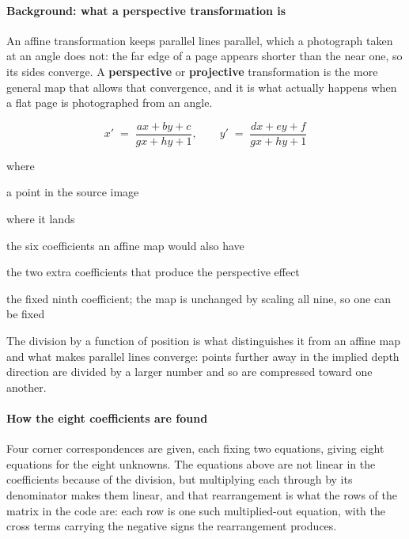\paragraph{Background: what a perspective transformation is}
An affine transformation keeps parallel lines parallel, which a photograph taken at an angle does not: the far edge of a page appears shorter than the near one, so its sides converge. A \textbf{perspective} or \textbf{projective} transformation is the more general map that allows that convergence, and it is what actually happens when a flat page is photographed from an angle.


\begin{equation}
x' \;=\; \frac{a x + b y + c}{g x + h y + 1}, \qquad y' \;=\; \frac{d x + e y + f}{g x + h y + 1}
\end{equation}

\noindent where
\begin{description}[leftmargin=2.4em,style=nextline,font=\normalfont\ttfamily]\setlength\itemsep{1pt}
  \item[{$x,\,y$}] \normalfont a point in the source image
  \item[{$x',\,y'$}] \normalfont where it lands
  \item[{$a \dots f$}] \normalfont the six coefficients an affine map would also have
  \item[{$g,\,h$}] \normalfont the two extra coefficients that produce the perspective effect
  \item[{$1$}] \normalfont the fixed ninth coefficient; the map is unchanged by scaling all nine, so one can be fixed
\end{description}
The division by a function of position is what distinguishes it from an affine map and what makes parallel lines converge: points further away in the implied depth direction are divided by a larger number and so are compressed toward one another.


\paragraph{How the eight coefficients are found}
Four corner correspondences are given, each fixing two equations, giving eight equations for the eight unknowns. The equations above are not linear in the coefficients because of the division, but multiplying each through by its denominator makes them linear, and that rearrangement is what the rows of the matrix in the code are: each row is one such multiplied-out equation, with the cross terms carrying the negative signs the rearrangement produces.

